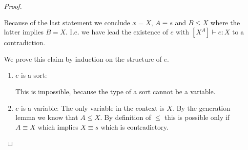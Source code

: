 \begin{theorem}
\begin{proof}
\begin{enumerate}
                Because of the last statement we conclude $x = X$, $A \equiv s$
                and $B \le X$ where the latter implies $B = X$. I.e. we have
                lead the existence of $e$ with $[X^A] \vdash e: X$ to a
                contradiction.

                We prove this claim by induction on the structure of $e$.
                \begin{enumerate}
                \item $e$ is a sort:

                    This is impossible, because the type of a sort cannot be a
                        variable.

                \item $e$ is a variable: The only variable in the context is
                    $X$. By the generation lemma we know that $A \le X$. By
                        definition of $\le$ this is possible only if $A \equiv
                        X$ which implies $X \equiv s$ which is contradictory.
                \end{enumerate}
        \end{enumerate}
    \end{proof}
\end{theorem}
